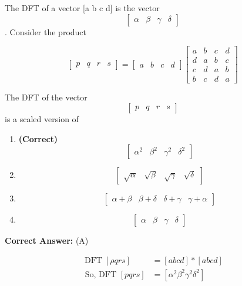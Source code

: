 \documentclass[11pt,a4paper]{article}
\begin{document}
\noindent The DFT of a vector [a b c d] is the vector 
\[
\begin{bmatrix} \alpha & \beta & \gamma &\delta \end{bmatrix}
\]
. Consider the product 

\[
\begin{bmatrix} p &q &r &s\end{bmatrix}=\begin{bmatrix} a &b &c &d \end{bmatrix}\begin{bmatrix} a &b &c &d \\ d &a &b & c\\ c& d &a &b \\ b&c &d &a \end{bmatrix}
\]

 The DFT of the vector 
\[
\begin{bmatrix} p &q &r &s \end{bmatrix}
\]
 is a scaled version of


\begin{enumerate}[label=(\Alph*)]
    \item \textbf{(Correct)} \[
\begin{bmatrix} \alpha ^{2} &\beta ^{2} &\gamma ^{2} &\delta ^{2} \end{bmatrix}
\]
    \item \[
\begin{bmatrix} \sqrt{\alpha } &\sqrt{\beta } &\sqrt{\gamma } &\sqrt{\delta } \end{bmatrix}
\]
    \item \[
\begin{bmatrix} \alpha +\beta &\beta +\delta &\delta +\gamma &\gamma +\alpha \end{bmatrix}
\]
    \item \[
\begin{bmatrix} \alpha &\beta &\gamma &\delta \end{bmatrix}
\]
\end{enumerate}

\noindent \textbf{Correct Answer:} (A)

\begin{tcolorbox}[solbox, title=Detailed Solution -- Question 140]
\[
\begin{aligned} \operatorname{DFT}[\rho q r s] &=[a b c d] *[a b c d] \\ \text { So, DFT }[p q r s] &=\left[\alpha^{2} \beta^{2} \gamma^{2} \delta^{2}\right] \end{aligned}
\]
\end{tcolorbox}
\end{document}
